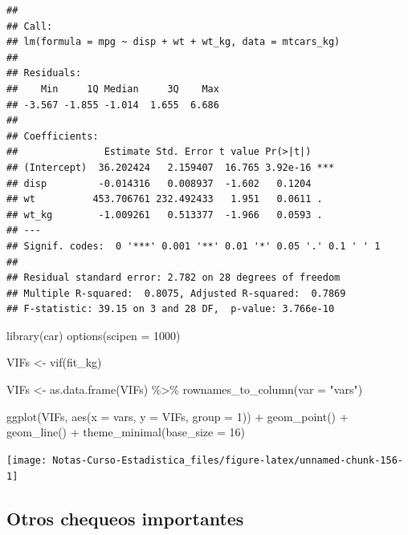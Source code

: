 \documentclass[
  12pt,
]{book}
\newenvironment{Shaded}{\begin{snugshade}}{\end{snugshade}}
\newcommand{\AttributeTok}[1]{\textcolor[rgb]{0.77,0.63,0.00}{#1}}
\newcommand{\DecValTok}[1]{\textcolor[rgb]{0.00,0.00,0.81}{#1}}
\newcommand{\FunctionTok}[1]{\textcolor[rgb]{0.00,0.00,0.00}{#1}}
\newcommand{\NormalTok}[1]{#1}
\newcommand{\OtherTok}[1]{\textcolor[rgb]{0.56,0.35,0.01}{#1}}
\newcommand{\SpecialCharTok}[1]{\textcolor[rgb]{0.00,0.00,0.00}{#1}}
\newcommand{\StringTok}[1]{\textcolor[rgb]{0.31,0.60,0.02}{#1}}
\begin{document}
\begin{verbatim}
## 
## Call:
## lm(formula = mpg ~ disp + wt + wt_kg, data = mtcars_kg)
## 
## Residuals:
##    Min     1Q Median     3Q    Max 
## -3.567 -1.855 -1.014  1.655  6.686 
## 
## Coefficients:
##               Estimate Std. Error t value Pr(>|t|)    
## (Intercept)  36.202424   2.159407  16.765 3.92e-16 ***
## disp         -0.014316   0.008937  -1.602   0.1204    
## wt          453.706761 232.492433   1.951   0.0611 .  
## wt_kg        -1.009261   0.513377  -1.966   0.0593 .  
## ---
## Signif. codes:  0 '***' 0.001 '**' 0.01 '*' 0.05 '.' 0.1 ' ' 1
## 
## Residual standard error: 2.782 on 28 degrees of freedom
## Multiple R-squared:  0.8075, Adjusted R-squared:  0.7869 
## F-statistic: 39.15 on 3 and 28 DF,  p-value: 3.766e-10
\end{verbatim}

\begin{Shaded}
\begin{Highlighting}[]
\FunctionTok{library}\NormalTok{(car)}
\FunctionTok{options}\NormalTok{(}\AttributeTok{scipen =} \DecValTok{1000}\NormalTok{)}

\NormalTok{VIFs }\OtherTok{\textless{}{-}} \FunctionTok{vif}\NormalTok{(fit\_kg)}

\NormalTok{VIFs }\OtherTok{\textless{}{-}} \FunctionTok{as.data.frame}\NormalTok{(VIFs) }\SpecialCharTok{\%\textgreater{}\%}
    \FunctionTok{rownames\_to\_column}\NormalTok{(}\AttributeTok{var =} \StringTok{"vars"}\NormalTok{)}

\FunctionTok{ggplot}\NormalTok{(VIFs, }\FunctionTok{aes}\NormalTok{(}\AttributeTok{x =}\NormalTok{ vars, }\AttributeTok{y =}\NormalTok{ VIFs, }\AttributeTok{group =} \DecValTok{1}\NormalTok{)) }\SpecialCharTok{+}
    \FunctionTok{geom\_point}\NormalTok{() }\SpecialCharTok{+} \FunctionTok{geom\_line}\NormalTok{() }\SpecialCharTok{+} \FunctionTok{theme\_minimal}\NormalTok{(}\AttributeTok{base\_size =} \DecValTok{16}\NormalTok{)}
\end{Highlighting}
\end{Shaded}

\begin{center}\texttt{[image: Notas-Curso-Estadistica\_files/figure-latex/unnamed-chunk-156-1]} \end{center}

\hypertarget{otros-chequeos-importantes}{%
\subsection{Otros chequeos
importantes}\label{otros-chequeos-importantes}}
\end{document}
